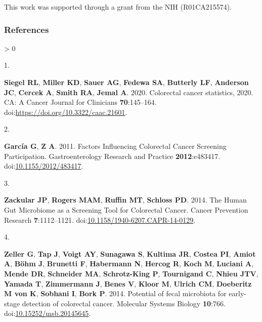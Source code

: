 \documentclass[
]{article}
\newlength{\cslhangindent}
\newlength{\csllabelwidth}
\newenvironment{CSLReferences}[2] %
 {%
  \setlength{\parindent}{0pt}
  \ifodd #1 \everypar{\setlength{\hangindent}{\cslhangindent}}\ignorespaces\fi
  \ifnum #2 > 0
  \setlength{\parskip}{#2\baselineskip}
  \fi
 }%
 {}
\newcommand{\CSLLeftMargin}[1]{\parbox[t]{\csllabelwidth}{#1}}
\newcommand{\CSLRightInline}[1]{\parbox[t]{\linewidth - \csllabelwidth}{#1}\break}
\begin{document}
This work was supported through a grant from the NIH (R01CA215574).

\newpage

\hypertarget{references}{%
\subsubsection{References}\label{references}}

\setlength{\parindent}{-0.25in}
\setlength{\leftskip}{0.25in}

\noindent

\hypertarget{refs}{}
\begin{CSLReferences}{0}{0}
\leavevmode\hypertarget{ref-siegel2020}{}%
\CSLLeftMargin{1. }
\CSLRightInline{\textbf{Siegel RL}, \textbf{Miller KD}, \textbf{Sauer
AG}, \textbf{Fedewa SA}, \textbf{Butterly LF}, \textbf{Anderson JC},
\textbf{Cercek A}, \textbf{Smith RA}, \textbf{Jemal A}. 2020. Colorectal
cancer statistics, 2020. CA: A Cancer Journal for Clinicians
\textbf{70}:145--164. doi:\url{https://doi.org/10.3322/caac.21601}.}

\leavevmode\hypertarget{ref-garcuxeda2011}{}%
\CSLLeftMargin{2. }
\CSLRightInline{\textbf{García G}, \textbf{Z A}. 2011. Factors
Influencing Colorectal Cancer Screening Participation. Gastroenterology
Research and Practice \textbf{2012}:e483417.
doi:\href{https://doi.org/10.1155/2012/483417}{10.1155/2012/483417}.}

\leavevmode\hypertarget{ref-zackular2014}{}%
\CSLLeftMargin{3. }
\CSLRightInline{\textbf{Zackular JP}, \textbf{Rogers MAM},
\textbf{Ruffin MT}, \textbf{Schloss PD}. 2014. The Human Gut Microbiome
as a Screening Tool for Colorectal Cancer. Cancer Prevention Research
\textbf{7}:1112--1121.
doi:\href{https://doi.org/10.1158/1940-6207.CAPR-14-0129}{10.1158/1940-6207.CAPR-14-0129}.}

\leavevmode\hypertarget{ref-zeller2014}{}%
\CSLLeftMargin{4. }
\CSLRightInline{\textbf{Zeller G}, \textbf{Tap J}, \textbf{Voigt AY},
\textbf{Sunagawa S}, \textbf{Kultima JR}, \textbf{Costea PI},
\textbf{Amiot A}, \textbf{Böhm J}, \textbf{Brunetti F},
\textbf{Habermann N}, \textbf{Hercog R}, \textbf{Koch M},
\textbf{Luciani A}, \textbf{Mende DR}, \textbf{Schneider MA},
\textbf{Schrotz-King P}, \textbf{Tournigand C}, \textbf{Nhieu JTV},
\textbf{Yamada T}, \textbf{Zimmermann J}, \textbf{Benes V},
\textbf{Kloor M}, \textbf{Ulrich CM}, \textbf{Doeberitz M von K},
\textbf{Sobhani I}, \textbf{Bork P}. 2014. Potential of fecal microbiota
for early-stage detection of colorectal cancer. Molecular Systems
Biology \textbf{10}:766.
doi:\href{https://doi.org/10.15252/msb.20145645}{10.15252/msb.20145645}.}


\end{CSLReferences}
\end{document}
